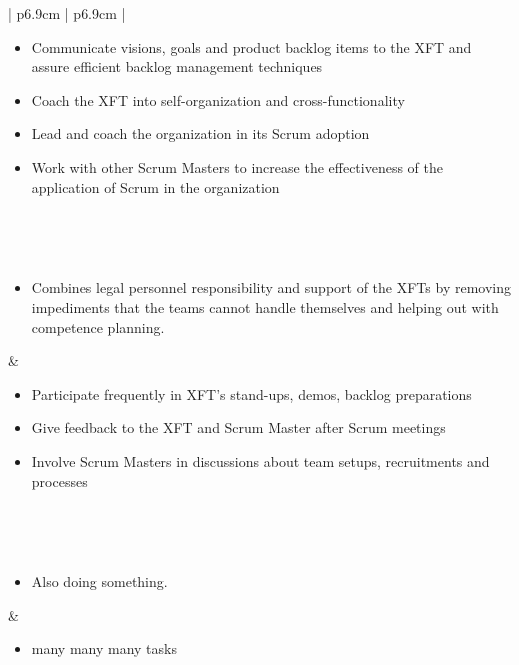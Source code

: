 \begin{table}[h]
\begin{tabularx}{\textwidth}{ | p{6.9cm} | p{6.9cm} | }
   \begin{itemize}[label={}, leftmargin=*, topsep=0pt, itemsep=0pt, partopsep=0pt]
     \item Communicate visions, goals and product backlog items to the XFT and assure efficient backlog management techniques
     \item Coach the XFT into self-organization and cross-functionality
     \item Lead and coach the organization in its Scrum adoption
     \item Work with other Scrum Masters to increase the effectiveness of the application of Scrum in the organization 
   \end{itemize} 
   
   \\ \hline

   
   \\ \hline 
   
   \begin{itemize}[label={}, leftmargin=*, topsep=0pt, itemsep=0pt, partopsep=0pt]
     \item Combines legal personnel responsibility and support of the XFTs by removing impediments that the teams cannot handle themselves and helping out with competence planning.  
   \end{itemize} & 
   
   \begin{itemize}[label={}, leftmargin=*, topsep=0pt, itemsep=0pt, partopsep=0pt]
     \item Participate frequently in XFT's stand-ups, demos, backlog preparations
     \item Give feedback to the XFT and Scrum Master after Scrum meetings
     \item Involve Scrum Masters in discussions about team setups, recruitments and processes 
   \end{itemize} 
   
   \\ \hline

   
   \\ \hline
   
   \begin{itemize}[label={}, leftmargin=*, topsep=0pt, itemsep=0pt, partopsep=0pt]
     \item Also doing something.
   \end{itemize} & 
   
   \begin{itemize}[label={}, leftmargin=*, topsep=0pt, itemsep=0pt, partopsep=0pt]
     \item many many many tasks 
   \end{itemize} 
   
   \\ \hline

  \end{tabularx}
  \caption{Roles descriptions}
\end{table}

